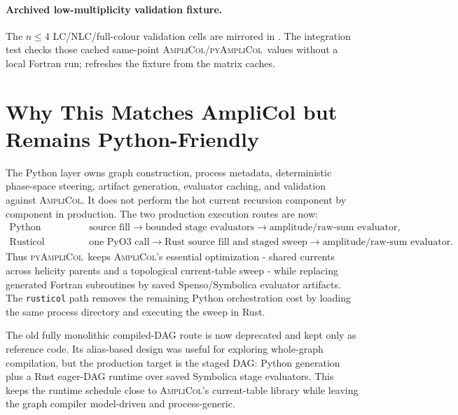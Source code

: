 \documentclass[10pt]{article}
\newcommand{\AC}{\textsc{AmpliCol}}
\newcommand{\PAC}{\textsc{pyAmpliCol}}
\begin{document}





\paragraph{Archived low-multiplicity validation fixture.}
The \(n\le4\) LC/NLC/full-colour validation cells are mirrored in
.  The integration test
checks those cached same-point \AC/\PAC\ values without a local Fortran run;
 refreshes the fixture from the
matrix caches.


\section{Why This Matches AmpliCol but Remains Python-Friendly}

The Python layer owns graph construction, process metadata, deterministic
phase-space steering, artifact generation, evaluator caching, and validation
against \AC.  It does not perform the hot current recursion component by
component in production.  The two production execution routes are now:
\begin{align*}
  \text{Python staged route:}&\quad
  \text{source fill} \to \text{bounded stage evaluators} \to
  \text{amplitude/raw-sum evaluator},\\
  \text{Rusticol route:}&\quad
  \text{one PyO3 call} \to \text{Rust source fill and staged sweep} \to
  \text{amplitude/raw-sum evaluator}.
\end{align*}
Thus \PAC\ keeps \AC's essential optimization - shared currents across helicity
parents and a topological current-table sweep - while replacing generated
Fortran subroutines by saved Spenso/Symbolica evaluator artifacts.  The
\texttt{rusticol} path removes the remaining Python orchestration cost by
loading the same process directory and executing the sweep in Rust.

The old fully monolithic compiled-DAG route is now deprecated and kept only as
reference code.  Its alias-based design was useful for exploring whole-graph
compilation, but the production target is the staged DAG: Python generation plus
a Rust eager-DAG runtime over saved Symbolica stage evaluators.  This keeps the
runtime schedule close to \AC's current-table library while leaving the graph
compiler model-driven and process-generic.
\end{document}
